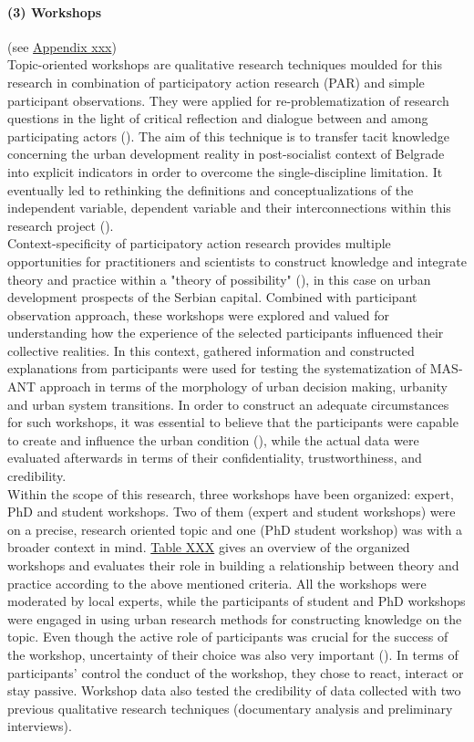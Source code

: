 \documentclass[11pt]{report}
\begin{document}
\paragraph{(3) Workshops} 
(see \href{ref}{Appendix xxx})
\\
Topic-oriented workshops are qualitative research techniques moulded for this research in combination of participatory action research (PAR) and simple participant observations. They were applied for re-problematization of research questions in the light of critical reflection and dialogue between and among participating actors (\cite{ref mcintyre PAR}). The aim of this technique is to transfer tacit knowledge concerning the urban development reality in post-socialist context of Belgrade into explicit indicators in order to overcome the single-discipline limitation. It eventually led to rethinking the definitions and conceptualizations of the independent variable, dependent variable and their interconnections within this research project (\cite{ref whyte PAR ref}). 
\\
Context-specificity of participatory action research provides multiple opportunities for practitioners and scientists to construct knowledge and integrate theory and practice within a "theory of possibility" (\cite{ref mcintyre PAR}), in this case on urban development prospects of the Serbian capital. Combined with participant observation approach, these workshops were explored and valued for understanding how the experience of the selected participants influenced their collective  realities. In this context, gathered information and constructed explanations from participants were used for testing the systematization of MAS-ANT approach in terms of the morphology of urban decision making, urbanity and urban system transitions. In order to construct an adequate circumstances for such workshops, it was essential to believe that the participants were capable to create and influence the urban condition (\cite{ref mcintyre PAR}), while the actual data were evaluated afterwards in terms of their confidentiality, trustworthiness, and credibility.
\\
Within the scope of this research, three workshops have been organized: expert, PhD and student workshops. Two of them (expert and student workshops) were on a precise, research oriented topic and one (PhD student workshop) was with a broader context in mind. \href{ref}{Table XXX} gives an overview of the organized workshops and evaluates their role in building a relationship between theory and practice according to the above mentioned criteria. All the workshops were moderated by local experts, while the participants of student and PhD workshops were engaged in using urban research methods for  constructing  knowledge on the topic. Even though the active role of participants was crucial for the success of the workshop, uncertainty of their choice was also very important (\cite{ref mcintyre PAR}). In terms of participants' control the conduct of the workshop, they chose to react, interact or stay passive. Workshop data also tested the credibility of data collected with two previous qualitative research techniques (documentary analysis and preliminary interviews).
\end{document}
